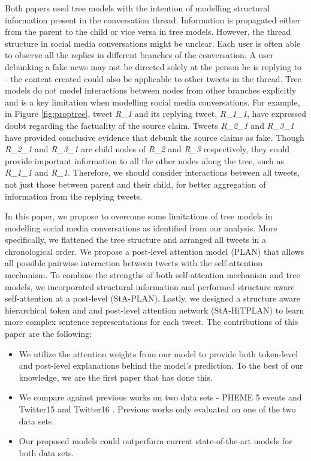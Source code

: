 \documentclass[letterpaper]{article} %
\begin{document}
Both papers used tree models with the intention of modelling structural information present in the conversation thread. Information is propagated either from the parent to the child or vice versa in tree models. However, the thread structure in social media conversations might be unclear. Each user is often able to observe all the replies in different branches of the conversation. A user debunking a fake news may not be directed solely at the person he is replying to - the content created could also be applicable to other tweets in the thread. Tree models do not model interactions between nodes from other branches explicitly and is a key limitation when modelling social media conversations. For example, in Figure \ref{fig:proptree}, tweet \textit{R\_1} and its replying tweet, \textit{R\_1\_1}, have expressed doubt regarding the factuality of the source claim. Tweets \textit{R\_2\_1} and \textit{R\_3\_1} have provided conclusive evidence that debunk the source claims as fake. Though \textit{R\_2\_1} and \textit{R\_3\_1} are child nodes of \textit{R\_2} and \textit{R\_3} respectively, they could provide important information to all the other nodes along the tree, such as \textit{R\_1\_1} and \textit{R\_1}. Therefore, we should consider interactions between all tweets, not just those between parent and their child, for better aggregation of information from the replying tweets.

In this paper, we propose to overcome some limitations of tree models in modelling social media conversations as identified from our analysis. More specifically, we flattened the tree structure and arranged all tweets in a chronological order. We propose a post-level attention model (PLAN) that allows all possible pairwise interaction between tweets with the self-attention mechanism. To combine the strengths of both self-attention mechanism and tree models, we incorporated structural information and performed structure aware self-attention at a post-level (StA-PLAN). Lastly, we designed a structure aware hierarchical token and and post-level attention network (StA-HiTPLAN) to learn more complex sentence representations for each tweet. \newline
\newline
The contributions of this paper are the following:
\begin{itemize}
\item We utilize the attention weights from our model to provide both token-level and post-level explanations behind the model's prediction. To the best of our knowledge, we are the first paper that has done this.
\item We compare against previous works on two data sets - PHEME 5 events \cite{kochkina_liakata_zubiaga_2018} and Twitter15 and Twitter16 \cite{ma17}. Previous works only evaluated on one of the two data sets.
\item  Our proposed models could outperform current state-of-the-art models for both data sets.
\end{itemize}
\end{document}
